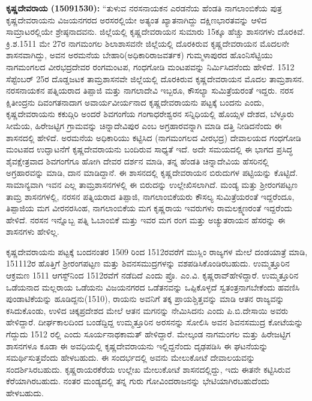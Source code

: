 \textbf{ ಕೃಷ್ಣದೇವರಾಯ (15091530):} “ತುಳುವ ನರಸನಾಯಕನ ಎರಡನೆಯ ಹೆಂಡತಿ ನಾಗಲಾಂಬಿಕೆಯ ಪುತ್ರ ಕೃಷ್ಣದೇವರಾಯನು ವಿಜಯನಗರದ ಅರಸರಲ್ಲಿಯೇ ಅತ್ಯಂತ ಖ್ಯಾತನಾಗಿದ್ದು ದಕ್ಷಿಣಭಾರತವನ್ನು ಆಳಿದ ಸಾಮ್ರಾಟರಲ್ಲಿಯೇ ಶ್ರೇಷ್ಠನಾದವನು. ಜಿಲ್ಲೆಯಲ್ಲಿ ಕೃಷ್ಣದೇವರಾಯನ ಸುಮಾರು 15ಕ್ಕೂ ಹೆಚ್ಚು ಶಾಸನಗಳು ದೊರಕಿವೆ. ಕ್ರಿ.ಶ.1511 ಮೇ 27ರ ನಾಗಮಂಗಲ ಶಿಲಾಶಾಸವನೇ ಜಿಲ್ಲೆಯಲ್ಲಿ ದೊರಕಿರುವ ಕೃಷ್ಣದೇವರಾಯನ ಮೊದಲನೇ ಶಾಸನವಾಗಿದ್ದು, ಅವನ ಅರಮನೆಯ ಬೇಹಾರಿ(ಅಧಿಕಾರಿರಾಜವರ್ತಕ) ಗುಮ್ಮಳಾಪುರದ ಹೊಂನಿಸೆಟ್ಟಿಯು ನಾಗಮಂಗಲದ ವೀರಭದ್ರದೇವರ ರಂಗಮಂಟಪ, ಗಂಧಗೋಡಿ ಮಂಟಪವನ್ನು ನಿರ್ಮಿಸಿದನೆಂದು ಹೇಳಿದೆ. 1512 ಸೆಪ್ಟೆಂಬರ್​ 25ರ ದೊಡ್ಡಜಟಕ ತಾಮ್ರಶಾಸನವೇ ಜಿಲ್ಲೆಯಲ್ಲಿ ದೊರಕಿರುವ ಕೃಷ್ಣದೇವರಾಯನ ಮೊದಲ ತಾಮ್ರಶಾಸನ. ನರಸನಾಯಕನ ಪತ್ನಿಯರಾದ ತಿಪ್ಪಾಜಿ ಮತ್ತು ನಾಗಲಾದೇವಿ ಇಬ್ಬರೂ, ಕೌಸಲ್ಯಾ ಸುಮಿತ್ರೆಯರಂತೆ ಇದ್ದರು. ನರಸ ಕ್ಷಿತೀಂದ್ರನು ದಿವಂಗತನಾದಾಗ ಅವಾರ್ಯವೀರ್ಯನಾದ ಕೃಷ್ಣದೇವರಾಯನು ಪಟ್ಟಕ್ಕೆ ಬಂದನು ಎಂದು, ಕೃಷ್ಣದೇವರಾಯನು ಕಕುದ್ಗಿರಿ ಅಂದರೆ ಶಿವಗಂಗೆಯ ಗಂಗಾಧರೇಶ್ವರನ ಸನ್ನಿಧಿಯಲ್ಲಿ ಹೊಯ್ಸಳ ದೇಶದ, ಬೆಳ್ಳೂರು ಸೀಮೆಯ, ಹಿರೇಜಟ್ಟಿಗ ಗ್ರಾಮವನ್ನು ಚಿನ್ನಾದೇವಿಪುರ ಎಂಬ ಅಗ್ರಹಾರವನ್ನಾಗಿ ಮಾಡಿ ದತ್ತಿ ನೀಡಿದನೆಂದು ಈ ಶಾಸನದಲ್ಲಿ ಹೇಳಿದೆ. ಅರಮನೆಯ ಅಧಿಕಾರಿಯು ಕಟ್ಟಿಸಿದ (ನಾಗಮಂಗಲದ ವೀರಭದ್ರ) ದೇವಾಲಯದ ಗಂಧಗೋಡಿ ಮಂಟಪದ ಉದ್ಘಾಟನೆಗೆ ಕೃಷ್ಣದೇವರಾಯನು ಬಂದಿರುವ ಸಾಧ್ಯತೆ ಇದೆ. ಅದೇ ಸಮಯದಲ್ಲಿ ಈ ಭಾಗದ ಪ್ರಸಿದ್ಧ ಶೈವಕ್ಷೇತ್ರವಾದ ಶಿವಗಂಗೆಗೂ ಹೋಗಿ ದೇವರ ದರ್ಶನ ಮಾಡಿ, ತನ್ನ ಹೆಂಡತಿ ಚಿನ್ನಾದೇವಿಯ ಹೆಸರಿನಲ್ಲಿ ಅಗ್ರಹಾರವನ್ನು ಮಾಡಿ, ದಾನ ಮಾಡಿದ್ದಾನೆ. ಈ ಶಾಸನದಲ್ಲಿ ಕೃಷ್ಣದೇವರಾಯನ ಬಿರುದುಗಳ ಪಟ್ಟಿಯನ್ನು ಕೊಟ್ಟಿದೆ. ಸಾಮಾನ್ಯವಾಗಿ ಇವನ ಎಲ್ಲ ತಾಮ್ರಶಾಸನಗಳಲ್ಲಿ ಈ ಬಿರುದನ್ನು ಉಲ್ಲೇಖಿಸಲಾಗಿದೆ. ಮಂಡ್ಯ ಮತ್ತು ಶ‍್ರೀರಂಗಪಟ್ಟಣ ತಾಮ್ರ ಶಾಸನಗಳಲ್ಲಿ, ನರಸನ ಪತ್ನಿಯರಾದ ತಿಪ್ಪಾಜಿ, ನಾಗಲಾಂಬಿಕೆಯರು ಕೌಸಲ್ಯ ಸುಮಿತ್ರೆಯರಂತೆ ಇದ್ದರೆಂದೂ, ತಿಪ್ಪಾಜಿಯ ಮಗ ವೀರನರಸಿಂಹ, ನಾಗಲಾಂಬಿಕೆಯ ಮಗ ಕೃಷ್ಣರಾಯ ಇವರುಗಳು ರಾಮಲಕ್ಷ್ಮಣರಂತೆ ಇದ್ದರೆಂದು ಹೇಳಿದೆ. ನರಸನ ಇನ್ನೊಬ್ಬ ಪತ್ನಿ ಓಬಾಂಬಿಕೆ ಮತ್ತು ಇವರ ಮಗ ರಂಗ ಮತ್ತು ಅಚ್ಯುತರಾಯನ ಹೆಸರನ್ನು ಈ ಶಾಸನಗಳು ಹೇಳಿಲ್ಲ.

ಕೃಷ್ಣದೇವರಾಯನು ಪಟ್ಟಕ್ಕೆ ಬಂದನಂತರ 1509 ರಿಂದ 1512ರವರೆಗೆ ಮುಸ್ಲಿಂ ರಾಜ್ಯಗಳ ಮೇಲೆ ದಂಡಯಾತ್ರೆ ಮಾಡಿ, 151112ರ ಹೊತ್ತಿಗೆ ಶ‍್ರೀರಂಗಪಟ್ಟಣ ಮತ್ತು ಶಿವನಸಮುದ್ರಗಳನ್ನು ವಶಪಡಿಸಿಕೊಂಡಿರಬಹುದು. ಉಮ್ಮತ್ತೂರಿನ ಆಕ್ರಮಣ 1511 ಆಗಸ್ಟ್​ನಿಂದ 1512ರವೆಗೆ ನಡೆದಿದೆ ಎಂದು ಪ್ರೊ. ಎಂ.ವಿ. ಕೃಷ್ಣರಾವ್​ ಹೇಳಿದ್ದಾರೆ. ಉಮ್ಮತ್ತೂರಿನ ಒಡೆಯನಾದ ಮಲ್ಲರಾಯ ಒಡೆಯನು ವಿಜಯನಗರದ ಒಡೆತನವನ್ನು ಒಪ್ಪಿಕೊಳ್ಳದೆ ಸ್ವತಂತ್ರನಾಗಬೇಕೆಂದು ಹವಣಿಸಿ ಪುಂಡಾಟಿಕೆಯನ್ನು ಹೂಡಿದ್ದನು(1510), ರಾಯನು ಅವನಿಗೆ ತಕ್ಕ ಪ್ರಾಯಶ್ಚಿತ್ತವನ್ನು ಮಾಡಿ ಆತನ ರಾಜ್ಯವನ್ನು ಕಸಿದುಕೊಂಡು, ಉಳಿದ ಚಿಕ್ಕಪ್ರದೇಶದ ಮೇಲೆ ಆತನ ಮಗನನ್ನು ನೇಮಿಸಿದನು ಎಂದು ಪಿ.ಬಿ.ದೇಸಾಯಿ ಅವರು ಹೇಳಿದ್ದಾರೆ. ದೀರ್ಘಕಾಲದಿಂದ ಬಂಡೆದ್ದಿದ್ದ ಉಮ್ಮತ್ತೂರಿನ ಅರಸನನ್ನು ಸೋಲಿಸಿ ಅವನ ಶಿವನಸಮುದ್ರ ಕೋಟೆಯನ್ನು ಗೆದ್ದುದು 1512 ರಲ್ಲಿ ಎಂದು ಸೂರ್ಯನಾಥಕಾಮತ್​ ಹೇಳಿದ್ದಾರೆ. ಮೇಲ್ಕಂಡ ನಾಗಮಂಗಲ ಮತ್ತು ಹಿರೇಜಟ್ಟಿಗ ಶಾಸನಗಳೂ ಕೂಡಾ ಈ ಅವಧಿಯಲ್ಲಿ ಕೃಷ್ಣದೇವರಾಯನು ಇಲ್ಲಿದ್ದನೆಂದು ದೃಢಪಡಿಸಿ ಈ ಘಟನೆಯನ್ನು ಸಮರ್ಥಿಸುತ್ತವೆಂದು ಹೇಳಬಹುದು. ಈ ಸಂದರ್ಭದಲ್ಲಿ ಅವನು ಮೇಲುಕೋಟೆ ದೇವಾಲಯವನ್ನು ಸಂದರ್ಶಿಸಿರಬಹುದು. ಕೃಷ್ಣರಾಯರಕೆರೆಯ ಉಲ್ಲೇಖ ಮೇಲುಕೋಟೆ ಶಾಸನದಲ್ಲಿದ್ದು, ಇದು ಈತನೇ ಕಟ್ಟಿಸಿರುವ ಕೆರೆಯಾಗಿರಬಹುದು. ನಂತರ ಮಂಡ್ಯದಲ್ಲಿ ತನ್ನ ಗುರು ಗೋವಿಂದರಾಜನನ್ನು ಭೇಟಿಯಾಗಿರಬಹುದೆಂದು ಹೇಳಬಹುದು. 

